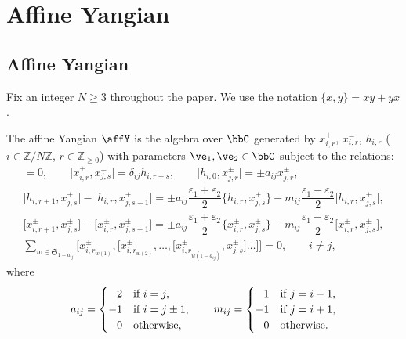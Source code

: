 \section{Affine Yangian}\label{sec:affine_Yangian}

\subsection{Affine Yangian}

Fix an integer $N \geq 3$ throughout the paper. We use the notation $\{x,y\}=xy+yx$.

\begin{dfn}\label{dfn:Yangian}The affine Yangian $\affY$ is the algebra over $\bbC$ generated by $x_{i,r}^{+}$, $x_{i,r}^{-}$, $h_{i,r}$ ($i \in \mathbb{Z} / N\mathbb{Z}$, $r \in \mathbb{Z}_{\geq 0}$) with parameters $\ve_1, \ve_2 \in \bbC$ subject to the relations:
\begin{gather*}
[h_{i,r}, h_{j,s}] = 0, \qquad \big[x_{i,r}^{+}, x_{j,s}^{-}\big] = \delta_{ij} h_{i, r+s}, \qquad \big[h_{i,0}, x_{j,r}^{\pm}\big] = \pm a_{ij} x_{j,r}^{\pm},\\
\big[h_{i, r+1}, x_{j, s}^{\pm}\big] - \big[h_{i, r}, x_{j, s+1}^{\pm}\big]= \pm a_{ij} \dfrac{\varepsilon_1 + \varepsilon_2}{2} \big\{h_{i, r}, x_{j, s}^{\pm}\big\} - m_{ij} \dfrac{\varepsilon_1 - \varepsilon_2}{2} \big[h_{i, r}, x_{j, s}^{\pm}\big],\\
\big[x_{i, r+1}^{\pm}, x_{j, s}^{\pm}\big] - \big[x_{i, r}^{\pm}, x_{j, s+1}^{\pm}\big]= \pm a_{ij}\dfrac{\varepsilon_1 + \varepsilon_2}{2} \big\{x_{i, r}^{\pm}, x_{j, s}^{\pm}\big\}
- m_{ij} \dfrac{\varepsilon_1 - \varepsilon_2}{2} \big[x_{i, r}^{\pm}, x_{j, s}^{\pm}\big],\\
\sum_{w \in \mathfrak{S}_{1 - a_{ij}}}\big[x_{i,r_{w(1)}}^{\pm}, \big[x_{i,r_{w(2)}}^{\pm}, \dots, \big[x_{i,r_{w(1 - a_{ij})}}^{\pm}, x_{j,s}^{\pm}\big]\dots\big]\big] = 0, \qquad i \neq j,
\end{gather*}
where
\begin{gather*}
a_{ij} =
\begin{cases}
\hphantom{-}2 &\text{if } i=j, \\
-1 &\text{if } i=j \pm 1, \\
\hphantom{-}0 &\text{otherwise,}
\end{cases}\qquad
m_{ij} =
\begin{cases}
\hphantom{-}1 &\text{if } j=i-1, \\
-1 &\text{if } j=i+1, \\
\hphantom{-}0 &\text{otherwise.}
\end{cases}
\end{gather*}
\end{dfn}

